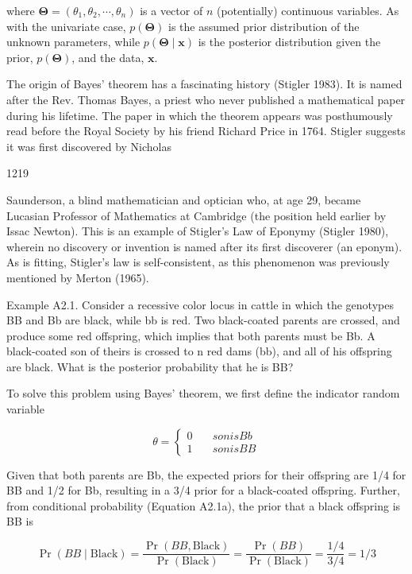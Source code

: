 \documentclass{article}
\begin{document}
where  $ \boldsymbol{\Theta} = (\theta_1, \theta_2, \cdots, \theta_n) $ is a vector of  $ n $ (potentially) continuous variables. As with the univariate case,  $ p(\boldsymbol{\Theta}) $ is the assumed prior distribution of the unknown parameters, while  $ p(\boldsymbol{\Theta} \mid \mathbf{x}) $ is the posterior distribution given the prior,  $ p(\boldsymbol{\Theta}) $, and the data,  $ \mathbf{x} $.

The origin of Bayes' theorem has a fascinating history (Stigler 1983). It is named after the Rev. Thomas Bayes, a priest who never published a mathematical paper during his lifetime. The paper in which the theorem appears was posthumously read before the Royal Society by his friend Richard Price in 1764. Stigler suggests it was first discovered by Nicholas

1219

Saunderson, a blind mathematician and optician who, at age 29, became Lucasian Professor of Mathematics at Cambridge (the position held earlier by Issac Newton). This is an example of Stigler's Law of Eponymy (Stigler 1980), wherein no discovery or invention is named after its first discoverer (an eponym). As is fitting, Stigler's law is self-consistent, as this phenomenon was previously mentioned by Merton (1965).

Example A2.1. Consider a recessive color locus in cattle in which the genotypes BB and Bb are black, while bb is red. Two black-coated parents are crossed, and produce some red offspring, which implies that both parents must be Bb. A black-coated son of theirs is crossed to n red dams (bb), and all of his offspring are black. What is the posterior probability that he is BB?

To solve this problem using Bayes' theorem, we first define the indicator random variable

\begin{equation}
\theta=\left\{\begin{aligned}0&\quad son is Bb\\ 1&\quad son is BB\end{aligned}\right.
\end{equation}

Given that both parents are Bb, the expected priors for their offspring are 1/4 for BB and 1/2 for Bb, resulting in a 3/4 prior for a black-coated offspring. Further, from conditional probability (Equation A2.1a), the prior that a black offspring is BB is

\begin{equation}
\Pr(BB\mid\mathrm{Black})=\frac{\Pr(BB,\mathrm{Black})}{\Pr(\mathrm{Black})}=\frac{\Pr(BB)}{\Pr(\mathrm{Black})}=\frac{1/4}{3/4}=1/3
\end{equation}
\end{document}
